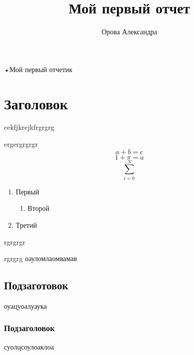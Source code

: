 \documentclass[10pt,a4paper]{article}
\author{Орова Александра}
\title{Мой первый отчет}
\begin{document}
\maketitle
\tableofcontents
•Мой первый отчетик

\section{Заголовок}
cekfjkrejkfrgrgrg


ergergrgrgr
\begin{equation}
a+b=c 
\end{equation}
\begin{equation}
1+\pi=a 
\end{equation}
\begin{equation}
\sum_{i=0}^N
\end{equation}

\begin{enumerate}
\item Первый \begin{enumerate}
\item Второй
\end{enumerate}
\item Третий
\end{enumerate}


rgrgrgr

rgrgrg
оауломлаомвамав
\subsection{Подзаготовок}
оуацуоалуаука
\subsubsection{Подзаголовок}
суолцсоулоаклоа
\end{document}
